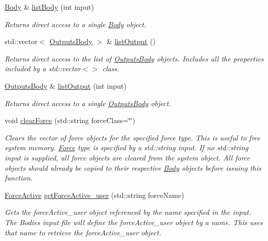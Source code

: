 \begin{DoxyCompactItemize}
\hyperlink{classosea_1_1ofreq_1_1_body}{Body} \& \hyperlink{classosea_1_1ofreq_1_1_system_af91978b3309a287948fc55773c4193e5}{list\-Body} (int input)
\begin{DoxyCompactList}\small\item\em Returns direct access to a single \hyperlink{classosea_1_1ofreq_1_1_body}{Body} object. \end{DoxyCompactList}\item 
std\-::vector$<$ \hyperlink{classosea_1_1ofreq_1_1_outputs_body}{Outputs\-Body} $>$ \& \hyperlink{classosea_1_1ofreq_1_1_system_ad2c5c4c5be9ed1b30651a267df67c466}{list\-Output} ()
\begin{DoxyCompactList}\small\item\em Returns direct access to the list of \hyperlink{classosea_1_1ofreq_1_1_outputs_body}{Outputs\-Body} objects. Includes all the properties included by a std\-::vector$<$$>$ class. \end{DoxyCompactList}\item 
\hyperlink{classosea_1_1ofreq_1_1_outputs_body}{Outputs\-Body} \& \hyperlink{classosea_1_1ofreq_1_1_system_a25b21c2fe11293ecf46ee3f9371afe21}{list\-Output} (int input)
\begin{DoxyCompactList}\small\item\em Returns direct access to a single \hyperlink{classosea_1_1ofreq_1_1_outputs_body}{Outputs\-Body} object. \end{DoxyCompactList}\item 
void \hyperlink{classosea_1_1ofreq_1_1_system_ac2c9763916fdfe6a7858c0efa87504c2}{clear\-Force} (std\-::string force\-Class=\char`\"{}\char`\"{})
\begin{DoxyCompactList}\small\item\em Clears the vector of force objects for the specified force type. This is useful to free system memory. \hyperlink{classosea_1_1ofreq_1_1_force}{Force} type is specified by a std\-::string input. If no std\-::string input is supplied, all force objects are cleared from the system object. All force objects should already be copied to their respective \hyperlink{classosea_1_1ofreq_1_1_body}{Body} objects before issuing this function. \end{DoxyCompactList}\item 
\hyperlink{classosea_1_1ofreq_1_1_force_active}{Force\-Active} \hyperlink{classosea_1_1ofreq_1_1_system_afd86228dddd4c9058adcff8de21c7d7f}{get\-Force\-Active\-\_\-user} (std\-::string force\-Name)
\begin{DoxyCompactList}\small\item\em Gets the force\-Active\-\_\-user object referenced by the name specified in the input. The Bodies input file will define the force\-Active\-\_\-user object by a name. This uses that name to retrieve the force\-Active\-\_\-user object. \end{DoxyCompactList}\item 

\end{DoxyCompactItemize}
